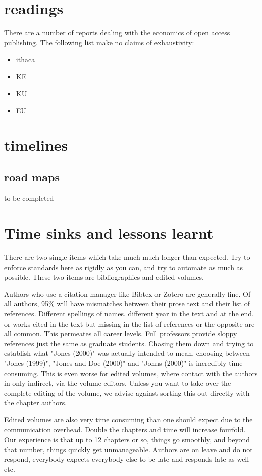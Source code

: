 \documentclass[guidelines,nonflat,modfonts] {langsci/langscibook}
\begin{document}
\chapter{readings} 
There are a number of reports dealing with the economics of open access publishing. The following list make no claims of exhaustivity:

\begin{itemize}
 \item ithaca 
 \item KE 
 \item KU 
 \item EU
\end{itemize}


\chapter{timelines}
\section{road maps}

to be completed 

\chapter{Time sinks and lessons learnt}
There are two single items which take much much longer than expected. Try to enforce standards here as rigidly as you can, and try to automate as much as possible. These two items are bibliographies and edited volumes. 

Authors who use a citation manager like Bibtex or Zotero are generally fine. Of all authors, 95\% will have mismatches between their prose text and their list of references. Different spellings of names, different year in the text and at the end, or works cited in the text but missing in the list of references or the opposite are all common. This permeates all career levels. Full professors provide sloppy references just the same as graduate students. Chasing them down and trying to establish what "Jones (2000)" was actually intended to mean, choosing between "Jones (1999)", "Jones and Doe (2000)" and "Johns (2000)" is incredibly time consuming. This is even worse for edited volumes, where contact with the authors in only indirect, via the volume editors. Unless you want to take over the complete editing of the volume, we advise against sorting this out directly with the chapter authors. 

Edited volumes are also very time consuming than one should expect due to the communication overhead. Double the chapters and time will increase fourfold. Our experience is that up to 12 chapters or so, things go smoothly, and beyond that number, things quickly get unmanageable. Authors are on leave and do not respond, everybody expects everybody else to be late and responds late as well etc. 
 
\end{document}

